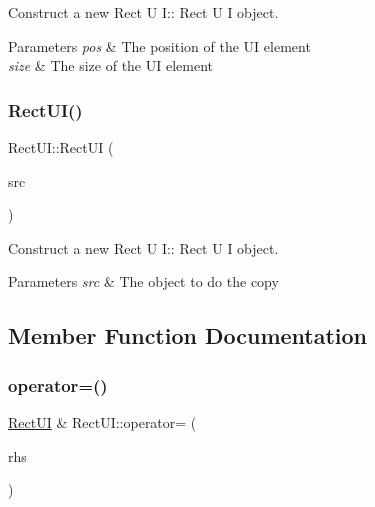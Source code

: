 Construct a new Rect U I\+:\+: Rect U I object. 


\begin{DoxyParams}{Parameters}
{\em pos} & The position of the UI element \\
\hline
{\em size} & The size of the UI element \\
\hline
\end{DoxyParams}
\mbox{\label{class_rect_u_i_af554331fbba88f4f533c50e91ec2a6f6}} 
\subsubsection{\texorpdfstring{Rect\+U\+I()}{RectUI()}\hspace{0.1cm}{\footnotesize\ttfamily [2/2]}}
{\footnotesize\ttfamily Rect\+U\+I\+::\+Rect\+UI (\begin{DoxyParamCaption}\item[{\hyperlink{class_rect_u_i}{Rect\+UI} const \&}]{src }\end{DoxyParamCaption})}



Construct a new Rect U I\+:\+: Rect U I object. 


\begin{DoxyParams}{Parameters}
{\em src} & The object to do the copy \\
\hline
\end{DoxyParams}


\subsection{Member Function Documentation}
\mbox{\label{class_rect_u_i_af4b45238eba02383a8a1c1140f3c4a3a}} 
\subsubsection{\texorpdfstring{operator=()}{operator=()}}
{\footnotesize\ttfamily \hyperlink{class_rect_u_i}{Rect\+UI} \& Rect\+U\+I\+::operator= (\begin{DoxyParamCaption}\item[{\hyperlink{class_rect_u_i}{Rect\+UI} const \&}]{rhs }\end{DoxyParamCaption})}



